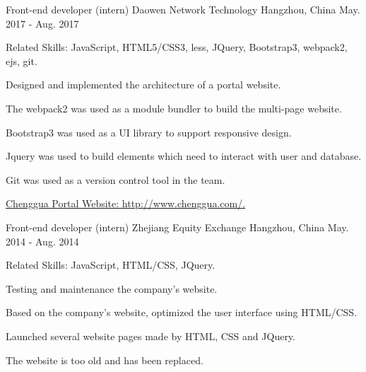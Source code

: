 

\begin{cventries}

    \cventry
        {Front-end developer (intern)} %
        {Daowen Network Technology} %
        {Hangzhou, China} %
        {May. 2017 - Aug. 2017} %
        {
            \begin{cvitems} %
                \item Related Skills: JavaScript, HTML5/CSS3, less, JQuery, Bootstrap3, webpack2, ejs, git.
                \item Designed and implemented the architecture of a portal website.
                \item The webpack2 was used as a module bundler to build the multi-page website. 
                \item Bootstrap3 was used as a UI library to support responsive design.
                \item Jquery was used to build elements which need to interact with user and database.
                \item Git was used as a version control tool in the team.
                \item {\href{http://www.chenggua.com/}{Chenggua Portal Website: http://www.chenggua.com/.}}
            \end{cvitems}
        }

    \cventry
        {Front-end developer (intern)} %
        {Zhejiang Equity Exchange} %
        {Hangzhou, China} %
        {May. 2014 - Aug. 2014} %
        {
            \begin{cvitems} %
                \item Related Skills: JavaScript, HTML/CSS, JQuery.
                \item Testing and maintenance the company's website.
                \item Based on the company's website, optimized the user interface using HTML/CSS.
                \item Launched several website pages made by HTML, CSS and JQuery.
                \item The website is too old and has been replaced.
            \end{cvitems}
        }

\end{cventries}


